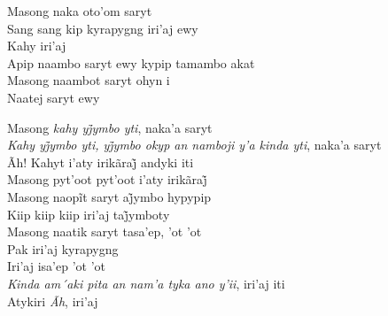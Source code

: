 \smallskip
 \begin{center}\end{center}
 \smallskip
\noindent Masong naka oto'om saryt\\
Sang sang kip kyrapygng iri'aj ewy\\
Kahy iri'aj\\
Apip naambo saryt ewy kypip tamambo akat\\
Masong naambot saryt ohyn i\\
Naatej saryt ewy

\smallskip
 \begin{center}\end{center}
 \smallskip
\noindent Masong \textit{kahy yj̃ymbo yti}, naka’a saryt\\
\textit{Kahy yj̃ymbo yti, yj̃ymbo okyp an namboji y’a kinda yti}, naka’a saryt\\
Ãh! Kahyt i’aty irikãraj̃ andyki iti\\
Masong pyt’oot pyt’oot i’aty irikãraj̃\\
Masong naopĩt saryt aj̃ymbo hypypip\\
Kiip kiip kiip iri’aj taj̃ymboty\\
Masong naatik saryt tasa'ep, 'ot 'ot\\
Pak iri'aj kyrapygng\\
Iri'aj isa'ep 'ot 'ot\\
\textit{Kinda am´aki pita an nam'a tyka ano y'ii}, iri'aj iti\\
Atykiri \textit{Ãh}, iri'aj

